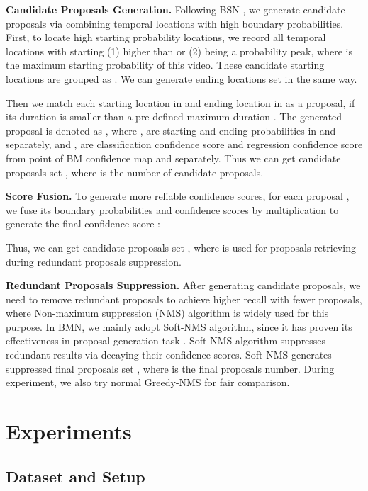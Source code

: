 \documentclass[10pt,twocolumn,letterpaper]{article}
\begin{document}
\noindent
\textbf{Candidate Proposals Generation.}
Following BSN \cite{lin2018bsn}, we generate candidate proposals via combining  temporal locations with high boundary probabilities. 
First, to locate high starting probability locations, we record all temporal locations  with starting  (1) higher than  or (2) being a probability peak, where  is the maximum starting probability of this video. These candidate starting locations are grouped as . 
We can generate ending locations set  in the same way.

Then we match each starting location  in  and ending location  in  as a  proposal, if its duration is smaller than a pre-defined maximum duration .
The generated  proposal  is denoted as  , where ,  are starting and ending probabilities in  and  separately, and ,  are classification confidence score and regression confidence score from  point of BM confidence map  and  separately.
Thus we can get candidate proposals set , where  is the number of candidate proposals.

\noindent
\textbf{Score Fusion.}
To generate more reliable confidence scores, for each proposal , we fuse its boundary probabilities and confidence scores by multiplication to generate the final confidence score :



Thus, we can get candidate proposals set , where  is used for proposals retrieving during redundant proposals suppression. 


\noindent
\textbf{Redundant Proposals Suppression.}
After generating candidate proposals, we need to remove redundant proposals to achieve higher recall with fewer proposals, where Non-maximum suppression (NMS) algorithm is widely used for this purpose.
In BMN, we mainly adopt Soft-NMS algorithm\cite{softNMS}, since it has proven its effectiveness in proposal generation task \cite{lin2018bsn}. Soft-NMS algorithm suppresses redundant results via decaying their confidence scores.
Soft-NMS generates suppressed final proposals set , where  is the final proposals number.
During experiment, we also try normal Greedy-NMS for fair comparison.


\section{Experiments}

\subsection{Dataset and Setup }
\end{document}
